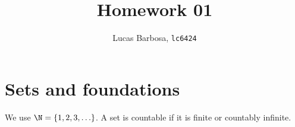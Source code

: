 \documentclass[nohyper,nobib,nofonts]{tufte-handout}
\title{Homework 01}
\author[Lucas Barbosa, lc6424]{Lucas Barbosa, \texttt{lc6424}}
\date{}
\begin{document}
\maketitle

\section{Sets and foundations}
\label{sec:hw01:sets-and-foundations}

We use $\N=\{1,2,3,\ldots\}$. A set is countable if it is finite
or countably infinite.




























\end{document}
